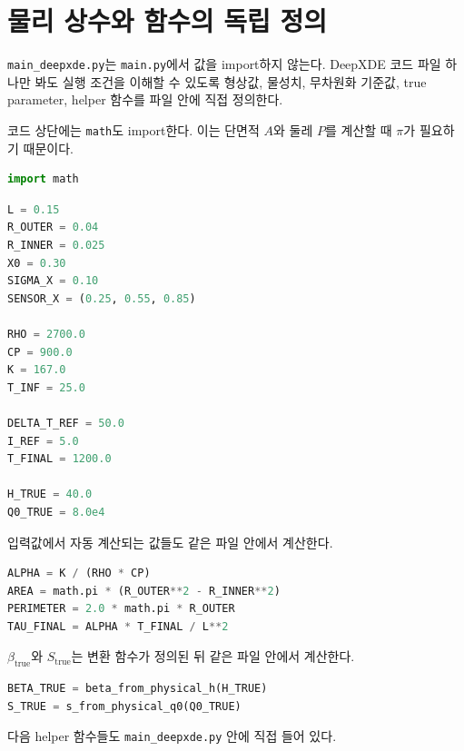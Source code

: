 \documentclass[11pt]{article}
\begin{document}
\section{물리 상수와 함수의 독립 정의}

\texttt{main\_deepxde.py}는 \texttt{main.py}에서 값을 import하지 않는다. DeepXDE 코드 파일 하나만 봐도 실행 조건을 이해할 수 있도록 형상값, 물성치, 무차원화 기준값, true parameter, helper 함수를 파일 안에 직접 정의한다.

코드 상단에는 \texttt{math}도 import한다. 이는 단면적 \(A\)와 둘레 \(P\)를 계산할 때 \(\pi\)가 필요하기 때문이다.

\begin{lstlisting}[language=Python]
import math
\end{lstlisting}

\begin{lstlisting}[language=Python]
L = 0.15
R_OUTER = 0.04
R_INNER = 0.025
X0 = 0.30
SIGMA_X = 0.10
SENSOR_X = (0.25, 0.55, 0.85)

RHO = 2700.0
CP = 900.0
K = 167.0
T_INF = 25.0

DELTA_T_REF = 50.0
I_REF = 5.0
T_FINAL = 1200.0

H_TRUE = 40.0
Q0_TRUE = 8.0e4
\end{lstlisting}

입력값에서 자동 계산되는 값들도 같은 파일 안에서 계산한다.

\begin{lstlisting}[language=Python]
ALPHA = K / (RHO * CP)
AREA = math.pi * (R_OUTER**2 - R_INNER**2)
PERIMETER = 2.0 * math.pi * R_OUTER
TAU_FINAL = ALPHA * T_FINAL / L**2
\end{lstlisting}

\(\beta_{\mathrm{true}}\)와 \(S_{\mathrm{true}}\)는 변환 함수가 정의된 뒤 같은 파일 안에서 계산한다.

\begin{lstlisting}[language=Python]
BETA_TRUE = beta_from_physical_h(H_TRUE)
S_TRUE = s_from_physical_q0(Q0_TRUE)
\end{lstlisting}

다음 helper 함수들도 \texttt{main\_deepxde.py} 안에 직접 들어 있다.
\end{document}
